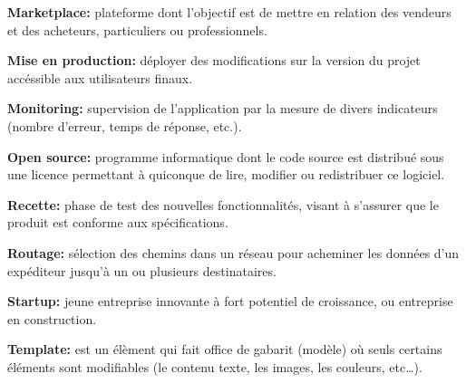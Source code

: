 \documentclass[12pt,a4paper]{article}
\begin{document}
  \bigskip

  \textbf{Marketplace:} plateforme dont l'objectif est de mettre en
  relation des vendeurs et des acheteurs, particuliers ou professionnels.

  \bigskip

  \textbf{Mise en production:} déployer des modifications sur la version
  du projet accéssible aux utilisateurs finaux.

  \bigskip

  \textbf{Monitoring:} supervision de l'application par la mesure de
  divers indicateurs (nombre d'erreur, temps de réponse, etc.).

  \bigskip

  \textbf{Open source:} programme informatique dont le code source est
  distribué sous une licence permettant à quiconque de lire, modifier ou
  redistribuer ce logiciel.

  \bigskip

  \textbf{Recette:} phase de test des nouvelles fonctionnalités, visant à
  s'assurer que le produit est conforme aux spécifications.

  \bigskip

  \textbf{Routage:} sélection des chemins dans un réseau pour acheminer
  les données d'un expéditeur jusqu'à un ou plusieurs destinataires.

  \bigskip

  \textbf{Startup:} jeune entreprise innovante à fort potentiel de
  croissance, ou entreprise en construction.

  \bigskip

  \textbf{Template:} est un élèment qui fait office de gabarit (modèle) où
  seuls certains éléments sont modifiables (le contenu texte, les images,
  les couleurs, etc\ldots{}).


  \newpage

  \listoffigures
\end{document}
